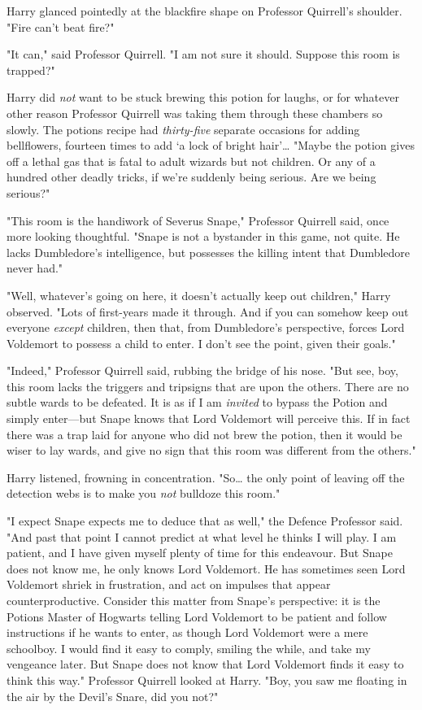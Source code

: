 Harry glanced pointedly at the blackfire shape on Professor Quirrell's
shoulder. "Fire can't beat fire?"

"It can," said Professor Quirrell. "I am not sure it should. Suppose this room
is trapped?"

Harry did \emph{not} want to be stuck brewing this potion for laughs, or for
whatever other reason Professor Quirrell was taking them through these chambers
so slowly. The potions recipe had \emph{thirty-five} separate occasions for
adding bellflowers, fourteen times to add `a lock of bright hair'{\ldots}
"Maybe the potion gives off a lethal gas that is fatal to adult wizards but not
children. Or any of a hundred other deadly tricks, if we're suddenly being
serious. Are we being serious?"

"This room is the handiwork of Severus Snape," Professor Quirrell said, once
more looking thoughtful. "Snape is not a bystander in this game, not quite. He
lacks Dumbledore's intelligence, but possesses the killing intent that
Dumbledore never had."

"Well, whatever's going on here, it doesn't actually keep out children," Harry
observed. "Lots of first-years made it through. And if you can somehow keep out
everyone \emph{except} children, then that, from Dumbledore's perspective,
forces Lord Voldemort to possess a child to enter. I don't see the point, given
their goals."

"Indeed," Professor Quirrell said, rubbing the bridge of his nose. "But see,
boy, this room lacks the triggers and tripsigns that are upon the others. There
are no subtle wards to be defeated. It is as if I am \emph{invited} to bypass
the Potion and simply enter---but Snape knows that Lord Voldemort will perceive
this. If in fact there was a trap laid for anyone who did not brew the potion,
then it would be wiser to lay wards, and give no sign that this room was
different from the others."

Harry listened, frowning in concentration. "So{\ldots} the only point of
leaving off the detection webs is to make you \emph{not} bulldoze this room."

"I expect Snape expects me to deduce that as well," the Defence Professor said.
"And past that point I cannot predict at what level he thinks I will play. I am
patient, and I have given myself plenty of time for this endeavour. But Snape
does not know me, he only knows Lord Voldemort. He has sometimes seen Lord
Voldemort shriek in frustration, and act on impulses that appear
counterproductive. Consider this matter from Snape's perspective: it is the
Potions Master of Hogwarts telling Lord Voldemort to be patient and follow
instructions if he wants to enter, as though Lord Voldemort were a mere
schoolboy. I would find it easy to comply, smiling the while, and take my
vengeance later. But Snape does not know that Lord Voldemort finds it easy to
think this way." Professor Quirrell looked at Harry. "Boy, you saw me floating
in the air by the Devil's Snare, did you not?"

